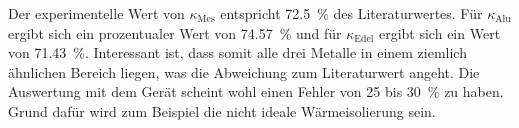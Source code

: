 \noindent Der experimentelle Wert von $\kappa_\text{Mes}$ entspricht \SI{72.5}{\percent} des Literaturwertes. 
Für $\kappa_\text{Alu}$ ergibt sich ein prozentualer Wert von \SI{74.57}{\percent} und für $\kappa_\text{Edel}$ ergibt sich ein Wert 
von \SI{71.43}{\percent}. Interessant ist, dass somit alle drei Metalle in einem ziemlich ähnlichen Bereich liegen, was die Abweichung zum 
Literaturwert angeht. 
Die Auswertung mit dem Gerät scheint wohl einen Fehler von \num{25} bis \SI{30}{\percent} zu haben. Grund dafür wird zum Beispiel die 
nicht ideale Wärmeisolierung sein.
